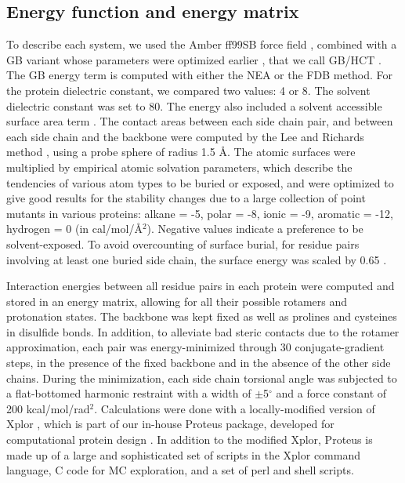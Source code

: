 \documentclass[a4paper,12pt]{article}
\begin{document}
\subsection{Energy function and energy matrix}
To describe each system, we used the Amber ff99SB force field \cite{Cornell95,Ponder03}, combined with a GB variant
whose parameters were optimized earlier \cite{Lopes07}, that we call GB/HCT \cite{Hawkins95,Moulinier03}. The GB energy
term is computed with either the NEA or the FDB method. For the protein dielectric constant, we compared two values:
4 or 8. The solvent dielectric constant was set to 80. The energy also included a solvent accessible surface area
term \cite{Lopes07,Schmidt08b}. The contact areas between each side chain pair, and between each side chain and the
backbone were computed by the Lee and Richards method \cite{Richards77}, using a probe sphere of radius 1.5 \AA. The
atomic surfaces were multiplied by empirical atomic solvation parameters, which describe the tendencies of various
atom types to be buried or exposed, and were optimized to give good results for the stability changes due to a large
collection of point mutants in various proteins: alkane = -5, polar = -8, ionic = -9, aromatic = -12, hydrogen = 0
(in cal/mol/\AA$^2$). Negative values indicate a preference to be solvent-exposed. To avoid overcounting of surface
burial, for residue pairs involving at least one buried side chain, the surface energy was scaled by 0.65 \cite{Lopes07,
Schmidt08,Polydorides13,Gaillard14}. 

Interaction energies between all residue pairs in each protein were computed and stored in an energy matrix, allowing
for all their possible rotamers and protonation states. The backbone was kept fixed as well as prolines and cysteines
in disulfide bonds. In addition, to alleviate bad steric contacts due to the rotamer approximation, each pair was
energy-minimized through 30 conjugate-gradient steps, in the presence of the fixed backbone and in the absence of the
other side chains. During the minimization, each side chain torsional angle was subjected to a flat-bottomed harmonic
restraint with a width of $\pm$5$^{\circ}$ and a force constant of 200 kcal/mol/rad$^2$. Calculations were done with a
locally-modified version of Xplor \cite{Xplor}, which is part of our  in-house Proteus package, developed for computational
protein design \cite{Schmidt08,Simonson13b}. In addition to the modified Xplor, Proteus is made up of a large and sophisticated
set of scripts in the Xplor command language, C code for MC exploration, and a set of perl and shell scripts. 
\end{document}
